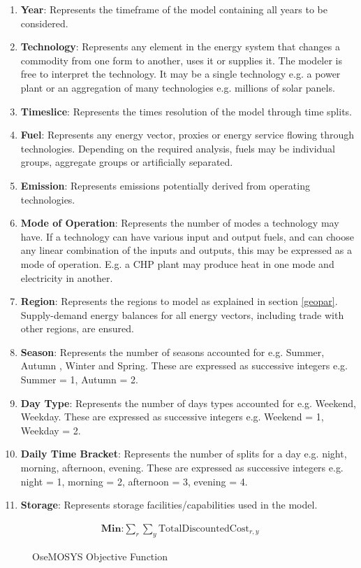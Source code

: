 \documentclass[12pt]{article}
\begin{document}
\begin{enumerate}
	\item \textbf{Year}: Represents the timeframe of the model containing all years to be considered.
	\item \textbf{Technology}: Represents any element in the energy system that changes a commodity from one form to another, uses it or supplies it.
	The modeler is free to interpret the technology. It may be a single technology e.g. a power plant or an aggregation of many technologies e.g. millions of solar panels.
	\item \textbf{Timeslice}: Represents the times resolution of the model through time splits.
	\item \textbf{Fuel}: Represents any energy vector, proxies or energy service flowing through technologies. Depending on the required analysis, fuels may be individual groups, aggregate groups or artificially separated.
	\item \textbf{Emission}: Represents emissions potentially derived from operating technologies.
	\item \textbf{Mode of Operation}: Represents the number of modes a technology may have. If a technology can have various input and output fuels, and can choose any linear combination of the inputs and outputs, this may be expressed as a mode of operation. E.g. a CHP plant may produce heat in one mode and electricity in another.
	\item \textbf{Region}: Represents the regions to model as explained in section \ref{geopar}. Supply-demand energy balances for all energy vectors, including trade with other regions, are ensured.
	\item \textbf{Season}: Represents the number of seasons accounted for e.g. Summer, Autumn , Winter and Spring. These are expressed as successive integers e.g. Summer = 1, Autumn = 2.
	\item \textbf{Day Type}: Represents the number of days types accounted for e.g. Weekend, Weekday. These are expressed as successive integers e.g. Weekend = 1, Weekday = 2.
	\item \textbf{Daily Time Bracket}: Represents the number of splits for a day e.g. night, morning, afternoon, evening. These are expressed as successive integers e.g. night = 1, morning = 2, afternoon = 3, evening = 4.
	\item \textbf{Storage}: Represents storage facilities/capabilities used in the model.
\end{enumerate}
\begin{figure}
	\begin{align*}
		\textbf{Min:} \sum_{r}\sum_{y} \text{TotalDiscountedCost}_{r,y}
	\end{align*}
	\caption{OseMOSYS Objective Function}
	\label{fig:OOF}
\end{figure}
\end{document}
